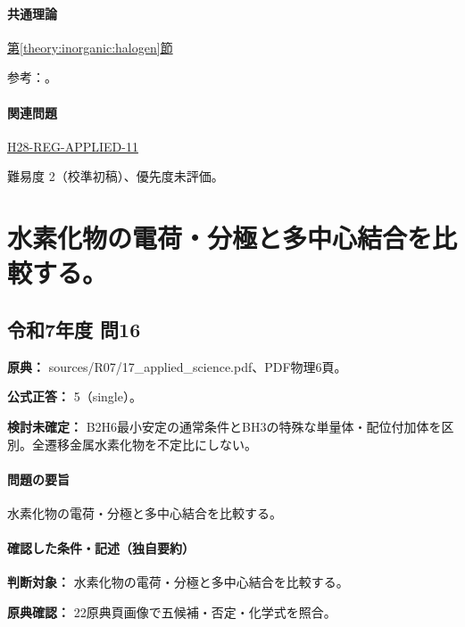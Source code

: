 \paragraph{共通理論} \hyperref[theory:inorganic:halogen]{第\ref*{theory:inorganic:halogen}節}

\par 参考：\cite{inorganic_halogen_ref,niosh_hf}。

\paragraph{関連問題} \hyperref[q:h28-reg-applied-11]{H28-REG-APPLIED-11}

\par 難易度 2（校準初稿）、優先度未評価。

\section{水素化物の電荷・分極と多中心結合を比較する。}

\subsection{令和7年度 問16}
\label{q:r07-reg-applied-16}

\noindent\textbf{原典：} sources/R07/17\_applied\_science.pdf、PDF物理6頁。

\textbf{公式正答：} 5（single）。

\par\textbf{検討未確定：} B2H6最小安定の通常条件とBH3の特殊な単量体・配位付加体を区別。全遷移金属水素化物を不定比にしない。

\paragraph{問題の要旨} 水素化物の電荷・分極と多中心結合を比較する。

\paragraph{確認した条件・記述（独自要約）}\mbox{}\par

\noindent\textbf{判断対象：} 水素化物の電荷・分極と多中心結合を比較する。\par

\noindent\textbf{原典確認：} 22原典頁画像で五候補・否定・化学式を照合。\par

